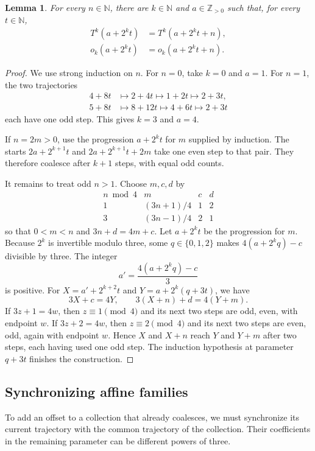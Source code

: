 \documentclass[11pt,a4paper]{article}
\newtheorem{lemma}[theorem]{Lemma}
\begin{document}
\begin{lemma}\label{lem:finite-pair}
For every $n\in\mathbb N$, there are $k\in\mathbb N$ and
$a\in\mathbb Z_{>0}$
such that, for every $t\in\mathbb N$,
\begin{align*}
T^k(a+2^kt)&=T^k(a+2^kt+n),\\
o_k(a+2^kt)&=o_k(a+2^kt+n).
\end{align*}
\end{lemma}
\begin{proof}
We use strong induction on $n$. For $n=0$, take $k=0$ and $a=1$.
For $n=1$, the two trajectories
\[
\begin{aligned}
4+8t&\longmapsto2+4t\longmapsto1+2t\longmapsto2+3t,\\
5+8t&\longmapsto8+12t\longmapsto4+6t\longmapsto2+3t
\end{aligned}
\]
each have one odd step. This gives $k=3$ and $a=4$.

If $n=2m>0$, use the progression $a+2^kt$ for $m$ supplied
by induction. The starts $2a+2^{k+1}t$ and
$2a+2^{k+1}t+2m$ take one even step to that pair. They therefore
coalesce after $k+1$ steps, with equal odd counts.

It remains to treat odd $n>1$. Choose $m,c,d$ by
\[
\begin{array}{c|ccc}
n\bmod4&m&c&d\\ \hline
1&(3n+1)/4&1&2\\
3&(3n-1)/4&2&1
\end{array}
\]
so that $0<m<n$ and $3n+d=4m+c$.
Let $a+2^kt$ be the progression for $m$.
Because $2^k$ is invertible modulo three, some
$q\in\{0,1,2\}$ makes $4(a+2^kq)-c$ divisible by three.
The integer
\[
a'=\frac{4(a+2^kq)-c}{3}
\]
is positive. For $X=a'+2^{k+2}t$ and
$Y=a+2^k(q+3t)$, we have
\[
3X+c=4Y,\qquad 3(X+n)+d=4(Y+m).
\]
If $3z+1=4w$, then $z\equiv1\pmod4$ and its next two
steps are odd, even, with endpoint $w$.
If $3z+2=4w$, then $z\equiv2\pmod4$ and its next two
steps are even, odd, again with endpoint $w$.
Hence $X$ and $X+n$ reach $Y$ and $Y+m$ after two steps,
each having used one odd step. The induction hypothesis at parameter
$q+3t$ finishes the construction.
\end{proof}

\subsection{Synchronizing affine families}

To add an offset to a collection that already coalesces, we must
synchronize its current trajectory with the common trajectory of the
collection. Their coefficients in the remaining parameter can be
different powers of three.
\end{document}
